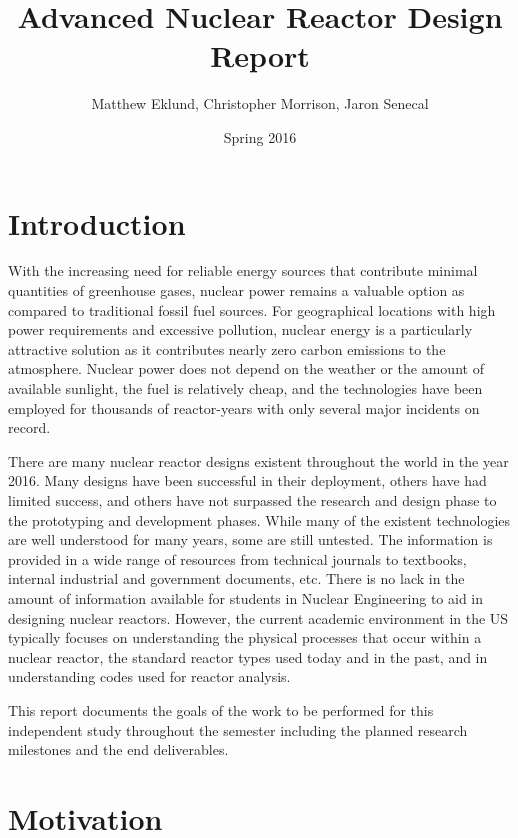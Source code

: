 \documentclass[]{report}
\title{Advanced Nuclear Reactor Design Report}
\author{Matthew Eklund, Christopher Morrison, Jaron Senecal}
\date{Spring 2016}
\begin{document}
\maketitle

\section{Introduction}

With the increasing need for reliable energy sources that contribute minimal quantities of greenhouse gases, nuclear power remains a valuable option as compared to traditional fossil fuel sources.  
For geographical locations with high power requirements and excessive pollution, nuclear energy is a particularly attractive solution as it contributes nearly zero carbon emissions to the atmosphere.  
Nuclear power does not depend on the weather or the amount of available sunlight, the fuel is relatively cheap, and the technologies have been employed for thousands of reactor-years %
with only several major incidents on record.

There are many nuclear reactor designs existent throughout the world in the year 2016.  
Many designs have been successful in their deployment, others have had limited success, and others have not surpassed the research and design phase to the prototyping and development phases.  
While many of the existent technologies are well understood for many years, some are still untested.  
The information is provided in a wide range of resources from technical journals to textbooks, internal industrial and government documents, etc.  
There is no lack in the amount of information available for students in Nuclear Engineering to aid in designing nuclear reactors.  
However, the current academic environment in the US typically focuses on understanding the physical processes that occur within a nuclear reactor, the standard reactor types used today and in the past, and in understanding codes used for reactor analysis.  

This report documents the goals of the work to be performed for this independent study throughout the semester including the planned research milestones and the end deliverables.

\section{Motivation}
\end{document}
